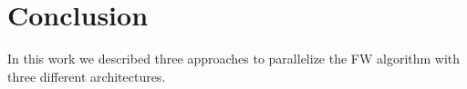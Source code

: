 \section*{Conclusion}

In this work we described three approaches to parallelize the FW algorithm with three different architectures.
